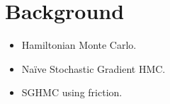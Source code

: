 
\section{Background}

\begin{itemize}
    \item Hamiltonian Monte Carlo.
    \item Naïve Stochastic Gradient HMC.
    \item SGHMC using friction.
\end{itemize}